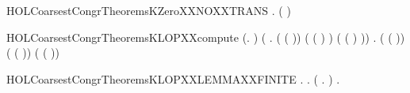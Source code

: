 \newcommand{\HOLCoarsestCongrTheoremsINFINITEXXEXISTSXXLEMMA}{\UseVerbatim{HOLCoarsestCongrTheoremsINFINITEXXEXISTSXXLEMMA}}
\begin{SaveVerbatim}{HOLCoarsestCongrTheoremsKZeroXXNOXXTRANS}
\HOLTokenTurnstile{} \HOLSymConst{\HOLTokenForall{}}  . \HOLSymConst{\HOLTokenNeg{}}(   \HOLTokenTransBegin{}\HOLTokenTransEnd {})
\end{SaveVerbatim}
\newcommand{\HOLCoarsestCongrTheoremsKZeroXXNOXXTRANS}{\UseVerbatim{HOLCoarsestCongrTheoremsKZeroXXNOXXTRANS}}
\begin{SaveVerbatim}{HOLCoarsestCongrTheoremsKLOPXXcompute}
\HOLTokenTurnstile{} (\HOLSymConst{\HOLTokenForall{}}.    \HOLSymConst{=} ) \HOLSymConst{\HOLTokenConj{}}
   (\HOLSymConst{\HOLTokenForall{}} .
          ( ( )) \HOLSymConst{=}
          ( ( ) \HOLSymConst{\ensuremath{-}} ) \HOLSymConst{\ensuremath{+}}
           ( ( ) \HOLSymConst{\ensuremath{-}} )) \HOLSymConst{\HOLTokenConj{}}
   \HOLSymConst{\HOLTokenForall{}} .
         ( ( )) \HOLSymConst{=}
         ( ( )) \HOLSymConst{\ensuremath{+}}
          ( ( ))
\end{SaveVerbatim}
\newcommand{\HOLCoarsestCongrTheoremsKLOPXXcompute}{\UseVerbatim{HOLCoarsestCongrTheoremsKLOPXXcompute}}
\begin{SaveVerbatim}{HOLCoarsestCongrTheoremsKLOPXXLEMMAXXFINITE}
\HOLTokenTurnstile{} \HOLSymConst{\HOLTokenForall{}} .
         \HOLSymConst{\HOLTokenConj{}}   \HOLSymConst{\HOLTokenImp{}}
       \HOLSymConst{\HOLTokenExists{}}.
             \HOLSymConst{\HOLTokenConj{}} (\HOLSymConst{\HOLTokenForall{}} .  \HOLTokenWeakTransBegin{}\HOLTokenWeakTransEnd {} \HOLSymConst{\HOLTokenImp{}} \HOLSymConst{\HOLTokenNeg{}}  ) \HOLSymConst{\HOLTokenConj{}}
           \HOLSymConst{\HOLTokenForall{}} .  \HOLTokenWeakTransBegin{}\HOLTokenWeakTransEnd {} \HOLSymConst{\HOLTokenImp{}} \HOLSymConst{\HOLTokenNeg{}}  
\end{SaveVerbatim}
